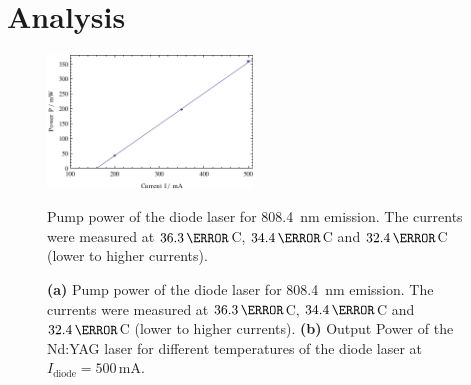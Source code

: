 \documentclass[a4paper]{scrartcl}
\numberwithin{equation}{section}
\numberwithin{figure}{section}
\numberwithin{table}{section}
\begin{document}
\section{Analysis}
\begin{figure}[!h]
\centering
\includegraphics[width=0.485\textwidth]{img/PvsI808.pdf}
\caption{ \small  Pump power of the diode laser for \SI{808.4}{nm} emission. The currents were measured at $36.3\,\degree$C, $34.4\,\degree$C and $32.4\,\degree$C (lower to higher currents). }
\label{fig:cal}

\centering
{}
\hfill
{}
\caption{\small \textbf{(a)} Pump power of the diode laser for \SI{808.4}{nm} emission. The currents were measured at $36.3\,\degree$C, $34.4\,\degree$C and $32.4\,\degree$C (lower to higher currents). \textbf{(b)} Output Power of the Nd:YAG laser for different temperatures of the diode laser at $I_\text{diode}=500\,\text{mA}$.}
\label{fig:power}
\end{figure}
\end{document}
